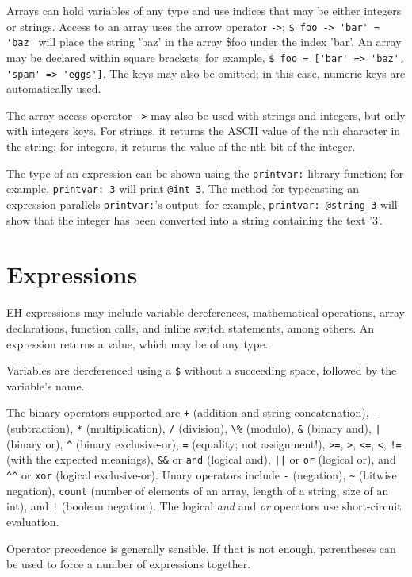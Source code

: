 \documentclass{article}
\begin{document}
Arrays can hold variables of any type and use indices that may be either integers or strings. 
Access to an array uses the arrow operator \verb#->#; \verb#$ foo -> 'bar' = 'baz'# will place the string 'baz' in the array \$foo under the index 'bar'. 
An array may be declared within square brackets; for example, \verb#$ foo = ['bar' => 'baz', 'spam' => 'eggs']#. 
The keys may also be omitted; in this case, numeric keys are automatically used.

The array access operator \verb#-># may also be used with strings and integers, but only with integers keys. 
For strings, it returns the ASCII value of the nth character in the string; for integers, it returns the value of the nth bit of the integer.

The type of an expression can be shown using the \verb#printvar:# library function; for example, \verb#printvar: 3# will print \verb#@int 3#. 
The method for typecasting an expression parallels \verb#printvar:#'s output: for example, \verb#printvar: @string 3# will show that the integer has been converted into a string containing the text '3'.

\section{Expressions}
EH expressions may include variable dereferences, mathematical operations, array declarations, function calls, and inline switch statements, among others. 
An expression returns a value, which may be of any type.

Variables are dereferenced using a \verb#$# without a succeeding space, followed by the variable's name.

The binary operators supported are \verb#+# (addition and string concatenation), \verb#-# (subtraction), \verb#*# (multiplication), \verb#/# (division), \verb#\%# (modulo), \verb#&# (binary and), \verb#|# (binary or), \verb#^# (binary exclusive-or), \verb#=# (equality; not assignment!), \verb#>=#, \verb#>#, \verb#<=#, \verb#<#, \verb#!=# (with the expected meanings), \verb#&&# or \verb#and# (logical and), \verb#||# or \verb#or# (logical or), and \verb#^^# or \verb#xor# (logical exclusive-or). 
Unary operators include \verb#-# (negation), \verb#~# (bitwise negation), \verb#count# (number of elements of an array, length of a string, size of an int), and \verb#!# (boolean negation). 
The logical \textit{and} and \textit{or} operators use short-circuit evaluation.

Operator precedence is generally sensible.
If that is not enough, parentheses can be used to force a number of expressions together.
\end{document}
